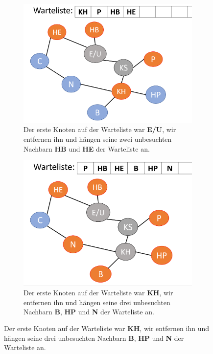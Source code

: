 \begin{figure}[H]
\begin{subfigure}[h]{0.45\textwidth}
    \label{fig:BS2}
    \end{subfigure}
    \vspace{5mm}
    \begin{subfigure}[h]{0.45\textwidth}
    \raggedright
    \includegraphics[width=\textwidth]{Pictures/BS/BFSB2.PNG}
    \caption{ Der erste Knoten auf der Warteliste war {\bf{E/U}}, wir entfernen ihn und hängen seine zwei unbesuchten Nachbarn {\bf{HB}} und {\bf{HE}} der Warteliste an.}
    \end{subfigure}
    \vspace{5mm}
    \qquad
    \begin{subfigure}[h]{0.45\textwidth}
    \raggedleft
    \includegraphics[width=\textwidth]{Pictures/BS/BFSB3.PNG}
    \caption{Der erste Knoten auf der Warteliste war {\bf{KH}}, wir entfernen ihn und hängen seine drei unbesuchten Nachbarn {\bf{B}}, {\bf{HP}} und {\bf{N}} der Warteliste an.} 
    \end{subfigure}
    \end{figure}
